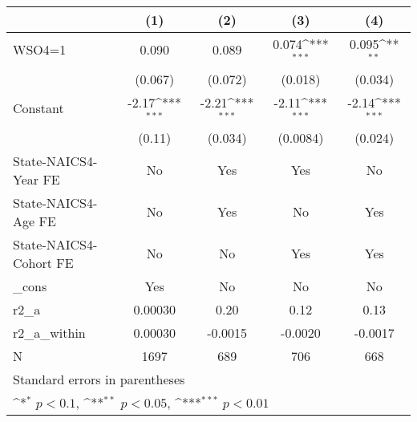 {
\def\sym#1{\ifmmode^{#1}\else\(^{#1}\)\fi}
\begin{tabular}{l*{4}{c}}
\hline\hline
                    &\multicolumn{1}{c}{(1)}         &\multicolumn{1}{c}{(2)}         &\multicolumn{1}{c}{(3)}         &\multicolumn{1}{c}{(4)}         \\
\hline
WSO4=1              &       0.090         &       0.089         &       0.074\sym{***}&       0.095\sym{**} \\
                    &     (0.067)         &     (0.072)         &     (0.018)         &     (0.034)         \\
[1em]
Constant            &       -2.17\sym{***}&       -2.21\sym{***}&       -2.11\sym{***}&       -2.14\sym{***}\\
                    &      (0.11)         &     (0.034)         &    (0.0084)         &     (0.024)         \\
[1em]
State-NAICS4-Year FE&          No         &         Yes         &         Yes         &          No         \\
[1em]
State-NAICS4-Age FE &          No         &         Yes         &          No         &         Yes         \\
[1em]
State-NAICS4-Cohort FE&          No         &          No         &         Yes         &         Yes         \\
[1em]
\_cons              &         Yes         &          No         &          No         &          No         \\
\hline
r2\_a                &     0.00030         &        0.20         &        0.12         &        0.13         \\
r2\_a\_within         &     0.00030         &     -0.0015         &     -0.0020         &     -0.0017         \\
N                   &        1697         &         689         &         706         &         668         \\
\hline\hline
\multicolumn{5}{l}{\footnotesize Standard errors in parentheses}\\
\multicolumn{5}{l}{\footnotesize \sym{*} \(p<0.1\), \sym{**} \(p<0.05\), \sym{***} \(p<0.01\)}\\
\end{tabular}
}
